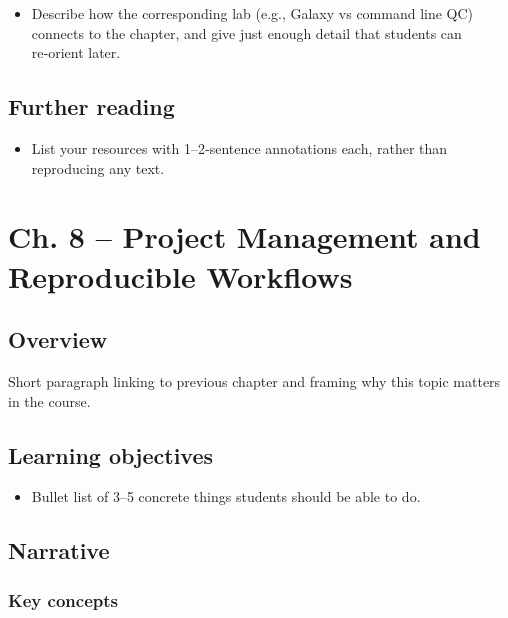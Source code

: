 \documentclass[
  letterpaper,
  DIV=11,
  numbers=noendperiod]{scrreprt}
\providecommand{\tightlist}{%
  \setlength{\itemsep}{0pt}\setlength{\parskip}{0pt}}
\begin{document}
\begin{itemize}
\tightlist
\item
  Describe how the corresponding lab (e.g., Galaxy vs command line QC)
  connects to the chapter, and give just enough detail that students can
  re‑orient later.
\end{itemize}

\section{Further reading}\label{further-reading-3}

\begin{itemize}
\tightlist
\item
  List your resources with 1--2‑sentence annotations each, rather than
  reproducing any text.
\end{itemize}


\chapter{Ch. 8 -- Project Management and Reproducible
Workflows}\label{ch.-8-project-management-and-reproducible-workflows}

\section{Overview}\label{overview-4}

Short paragraph linking to previous chapter and framing why this topic
matters in the course.

\section{Learning objectives}\label{learning-objectives-4}

\begin{itemize}
\tightlist
\item
  Bullet list of 3--5 concrete things students should be able to do.
\end{itemize}

\section{Narrative}\label{narrative-4}

\subsection{Key concepts}\label{key-concepts-4}
\end{document}
